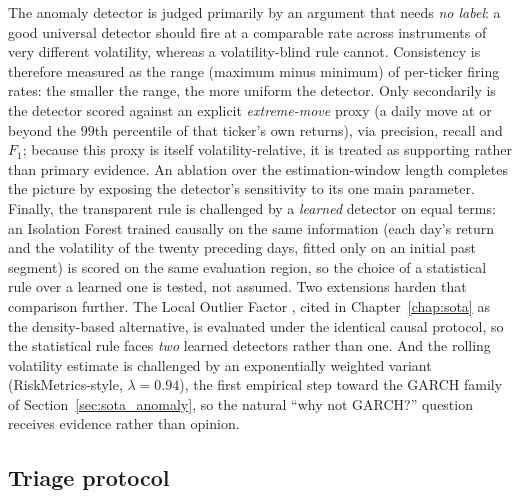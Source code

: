 The anomaly detector is judged primarily by an argument that needs \emph{no label}: a good universal
detector should fire at a comparable rate across instruments of very different volatility, whereas a
volatility-blind rule cannot. Consistency is therefore measured as the range (maximum minus minimum) of
per-ticker firing rates: the smaller the range, the more uniform the detector. Only secondarily is the
detector scored against an explicit \emph{extreme-move} proxy (a daily move at or beyond the $99$th
percentile of that ticker's own returns), via precision, recall and $F_1$; because this proxy is itself
volatility-relative, it is treated as supporting rather than primary evidence. An ablation over the
estimation-window length completes the picture by exposing the detector's sensitivity to its one main
parameter. Finally, the transparent rule is challenged by a \emph{learned} detector on equal terms: an
Isolation Forest \autocite{liu2008isolation} trained causally on the same information (each day's return
and the volatility of the twenty preceding days, fitted only on an initial past segment) is scored on the
same evaluation region, so the choice of a statistical rule over a learned one is tested, not assumed.
Two extensions harden that comparison further. The Local Outlier Factor \autocite{breunig2000lof}, cited
in Chapter~\ref{chap:sota} as the density-based alternative, is evaluated under the identical causal
protocol, so the statistical rule faces \emph{two} learned detectors rather than one. And the rolling
volatility estimate is challenged by an exponentially weighted variant (RiskMetrics-style,
$\lambda = 0.94$), the first empirical step toward the GARCH family of Section~\ref{sec:sota_anomaly},
so the natural ``why not GARCH?'' question receives evidence rather than opinion.

\subsection{Triage protocol}
\label{sec:met_eval_triage}

